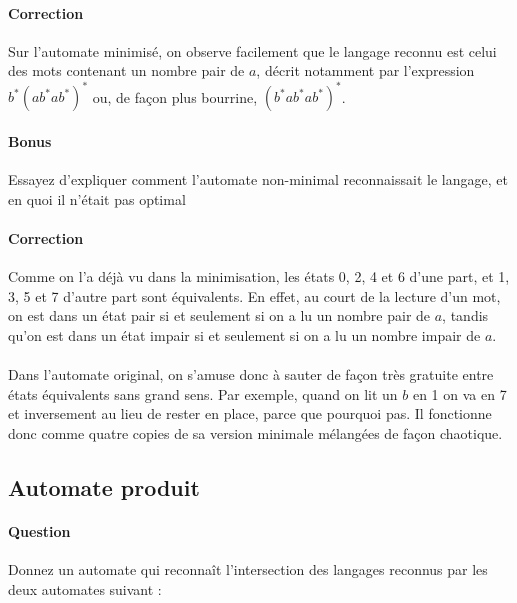 \documentclass{article}[11pt]
\theoremstyle{definition}
\begin{document}
\paragraph{Correction} Sur l'automate minimisé, on observe facilement que le langage reconnu est celui des mots contenant un nombre pair de $a$, décrit notamment par l'expression $b^*(ab^*ab^*)^*$ ou, de façon plus bourrine, $(b^*ab^*ab^*)^*$.

\paragraph{Bonus} Essayez d'expliquer comment l'automate non-minimal reconnaissait le langage, et en quoi il n'était pas optimal

\paragraph{Correction} Comme on l'a déjà vu dans la minimisation, les états 0, 2, 4 et 6 d'une part, et 1, 3, 5 et 7 d'autre part sont équivalents. En effet, au court de la lecture d'un mot, on est dans un état pair si et seulement si on a lu un nombre pair de $a$, tandis qu'on est dans un état impair si et seulement si on a lu un nombre impair de $a$. 

\paragraph{} Dans l'automate original, on s'amuse donc à sauter de façon très gratuite entre états équivalents sans grand sens. Par exemple, quand on lit un $b$ en 1 on va en 7 et inversement au lieu de rester en place, parce que pourquoi pas. Il fonctionne donc comme quatre copies de sa version minimale mélangées de façon chaotique.

\subsection{Automate produit}

\paragraph{Question} Donnez un automate qui reconnaît l'intersection des langages reconnus par les deux automates suivant :
\end{document}
